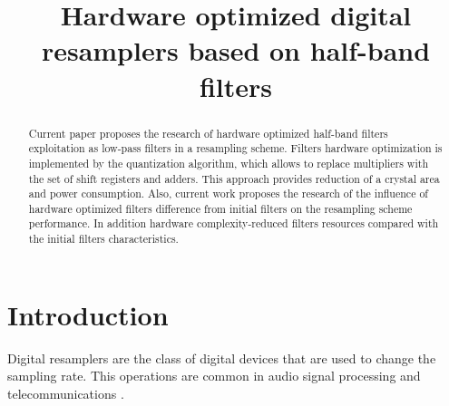 \documentclass[conference]{IEEEtran}
\begin{document}
\title{Hardware optimized digital resamplers based on half-band filters\\
}

\author{
\and
{}
\and
{}
}

\maketitle

	\begin{abstract}
		Current paper proposes the research of hardware optimized half-band filters exploitation as low-pass filters in a resampling scheme. Filters hardware optimization is implemented by the quantization algorithm, which allows to replace multipliers with the set of shift registers and adders. This approach provides reduction of a crystal area and power consumption. Also, current work proposes the research of the influence of hardware optimized filters difference from initial filters on the resampling scheme performance. In addition hardware complexity-reduced filters resources compared with the initial filters characteristics.
	\end{abstract}
	
	\section{Introduction}
	Digital resamplers are the class of digital devices that are used to change the sampling rate. This operations are common  in audio signal processing \cite{audio_resampler} and telecommunications \cite{resampler_telecom}.
	
\end{document}
